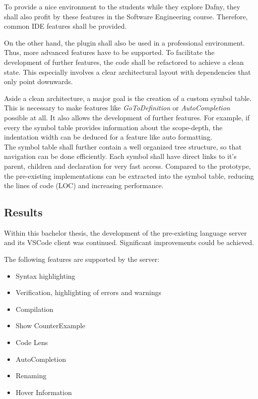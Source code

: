 To provide a nice environment to the students while they explore Dafny, they shall also profit by these features in the Software Engineering course.
Therefore, common IDE features shall be provided.

On the other hand, the plugin shall also be used in a professional environment.
Thus, more advanced features have to be supported.
To facilitate the development of further features, the code shall be refactored to achieve a clean state.
This especially involves a clear architectural layout with dependencies that only point downwards.

Aside a clean architecture, a major goal is the creation of a custom symbol table.
This is necessary to make features like \textit{GoToDefinition} or \textit{AutoCompletion} possible at all.
It also allows the development of further features.
For example, if every the symbol table provides information about the scope-depth, the indentation width can be deduced for a feature like auto formatting.\\

The symbol table shall further contain a well organized tree structure, so that navigation can be done efficiently.
Each symbol shall have direct links to it's parent, children and declaration for very fast access.
Compared to the prototype, the pre-existing implementations can be extracted into the symbol table, reducing the lines of code (LOC) and increasing performance.



\subsection{Results}
\label{section:managment_summary:results}
Within this bachelor thesis, the development of the pre-existing language server and its VSCode client was continued.
Significant improvements could be achieved.

The following features are supported by the server:
\begin{itemize}
    \item Syntax highlighting
    \item Verification, highlighting of errors and warnings
    \item Compilation
    \item Show CounterExample
    \item Code Lens
    \item AutoCompletion
    \item Renaming
    \item Hover Information
\end{itemize}

